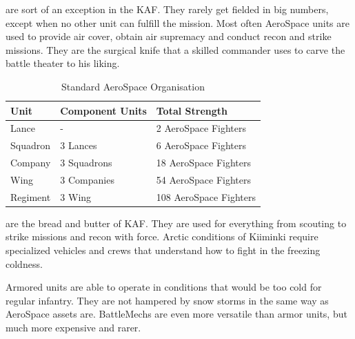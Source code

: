 \documentclass{tufte-book}
\begin{document}
 are sort of an exception in the KAF. 
They rarely get fielded in big numbers, except when no other unit can
fulfill the mission. Most often AeroSpace units are used to provide air
cover, obtain air supremacy and conduct recon and strike missions. They
are the surgical knife that a skilled commander uses to carve the battle
theater to his liking.

\bigskip
\begin{table}
\begin{minipage}{\textwidth}
\begin{center}
\begin{tabular}{lll}
\toprule
Unit & Component Units & Total Strength \\
\midrule
Lance    & -           & 2 AeroSpace Fighters \\
Squadron & 3 Lances    & 6 AeroSpace Fighters \\
Company  & 3 Squadrons & 18 AeroSpace Fighters \\
Wing     & 3 Companies & 54 AeroSpace Fighters \\
Regiment & 3 Wing      & 108 AeroSpace Fighters \\
\bottomrule
\end{tabular}
\end{center}
\end{minipage}
\caption{Standard AeroSpace Organisation}
\end{table}

 are the bread and butter of KAF. 
They are used for everything from scouting to strike missions and recon 
with force. Arctic conditions of Kiiminki require specialized vehicles 
and crews that understand how to fight in the freezing coldness.

Armored units are able to operate in conditions that would be too cold
for regular infantry. They are not hampered by snow storms in the same
way as AeroSpace assets are. BattleMechs are even more versatile than
armor units, but much more expensive and rarer.
\end{document}
